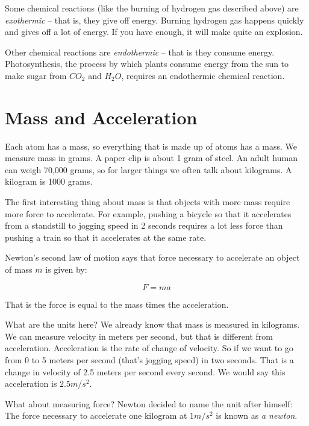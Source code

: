 Some chemical reactions (like the burning of hydrogen gas described
above) are \textit{exothermic} -- that is, they give off energy.
Burning hydrogen gas happens quickly and gives off a lot of energy. If
you have enough, it will make quite an explosion.

Other chemical reactions are \textit{endothermic} -- that is they consume
energy.  Photosynthesis, the process by which plants consume energy
from the sun to make sugar from $CO_2$ and $H_2O$, requires an endothermic
chemical reaction.

\section{Mass and Acceleration}

Each atom has a mass, so everything that is made up of atoms has a
mass.  We measure mass in grams.  A paper clip is about 1 gram of
steel. An adult human can weigh 70,000 grams, so for larger things we
often talk about kilograms. A kilogram is 1000 grams.

The first interesting thing about mass is that objects with more mass
require more force to accelerate. For example, pushing a bicycle so
that it accelerates from a standstill to jogging speed in 2 seconds
requires a lot less force than pushing a train so that it accelerates
at the same rate.

Newton's second law of motion says that force necessary to accelerate
an object of mass $m$ is given by:

$$F = m a$$

That is the force is equal to the mass times the acceleration.

What are the units here? We already know that mass is measured in
kilograms. We can measure velocity in meters per second, but that is
different from acceleration. Acceleration is the rate of change of
velocity. So if we want to go from 0 to 5 meters per second (that's
jogging speed) in two seconds. That is a change in velocity of 2.5
meters per second every second. We would say this acceleration is $2.5
m/s^2$.

What about measuring force? Newton decided to name the unit after
himself: The force necessary to accelerate one kilogram at $1 m/s^2$
is known as \textit{a newton}.

